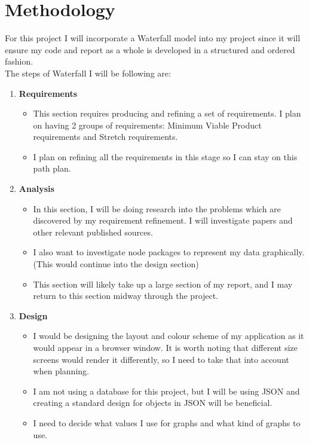 \documentclass{report}
\begin{document}
\chapter{Methodology}
For this project I will incorporate a Waterfall model into my project since it will ensure my code and report as a whole is developed in a structured and ordered fashion.\\
The steps of Waterfall I will be following are:
\begin{enumerate}
    \item \textbf{\large{Requirements}}
    \begin{itemize}
        \item This section requires producing and refining a set of requirements. I plan on having 2 groups of requirements: Minimum Viable Product requirements and Stretch requirements.
        \item I plan on refining all the requirements in this stage so I can stay on this path plan.
    \end{itemize}
    \item \textbf{\large{Analysis}}
    \begin{itemize}
        \item In this section, I will be doing research into the problems which are discovered by my requirement refinement. I will investigate papers and other relevant published sources.
        \item I also want to investigate node packages to represent my data graphically. (This would continue into the design section)
        \item This section will likely take up a large section of my report, and I may return to this section midway through the project.
    \end{itemize}
    \item \textbf{\large{Design}}
    \begin{itemize}
        \item I would be designing the layout and colour scheme of my application as it would appear in a browser window. It is worth noting that different size screens would render it differently, so I need to take that into account when planning.
        \item I am not using a database for this project, but I will be using JSON and creating a standard design for objects in JSON will be beneficial.
        \item I need to decide what values I use for graphs and what kind of graphs to use.
    \end{itemize}

\end{enumerate}
\end{document}

